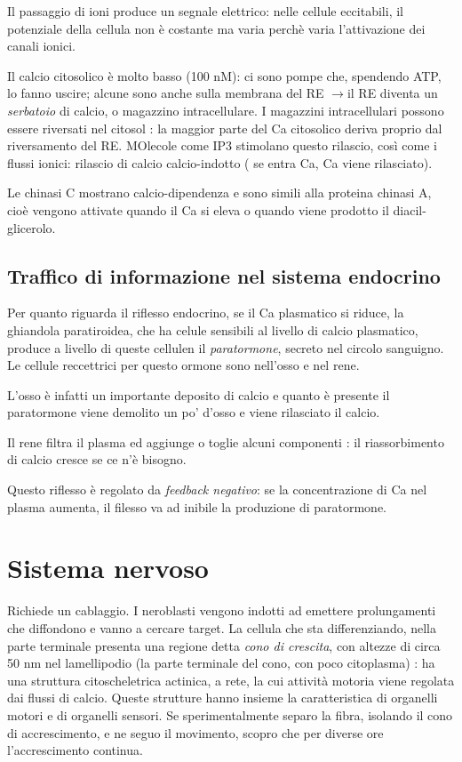 \documentclass[a4paper,12pt]{article}
\newcommand{\lfreccia}{\ensuremath{\longrightarrow}}
\begin{document}
Il passaggio di ioni produce un segnale elettrico: nelle cellule eccitabili, il potenziale della cellula non è costante ma varia perchè varia l'attivazione dei canali ionici.

Il calcio citosolico  è molto basso (100 nM): ci sono pompe che, spendendo ATP, lo fanno uscire; alcune sono anche sulla membrana del RE \lfreccia il RE diventa un \emph{serbatoio} di calcio, o magazzino intracellulare.
I magazzini intracellulari possono essere riversati nel citosol : la maggior parte del Ca citosolico deriva proprio dal riversamento del RE. MOlecole come IP3 stimolano questo rilascio, così come i flussi ionici: rilascio di calcio calcio-indotto ( se entra Ca, Ca viene rilasciato).

Le chinasi C mostrano calcio-dipendenza e sono simili alla proteina chinasi A, cioè vengono attivate quando il Ca si eleva o quando viene prodotto il diacil-glicerolo.

\subsection{Traffico di informazione nel sistema endocrino}
Per quanto riguarda il riflesso endocrino, se il Ca plasmatico si riduce, la ghiandola paratiroidea, che ha celule sensibili al livello di calcio plasmatico, produce a livello di queste cellulen il \emph{paratormone}, secreto nel circolo sanguigno. Le cellule reccettrici per questo ormone sono nell'osso e nel rene. 

L'osso è infatti un importante deposito di calcio e quanto è presente il paratormone viene demolito un po' d'osso e viene rilasciato il calcio. 

Il rene filtra il plasma ed aggiunge o toglie alcuni componenti : il riassorbimento di calcio cresce se ce n'è bisogno.

Questo riflesso è regolato da \emph{feedback negativo}: se la concentrazione di Ca nel plasma aumenta, il filesso va ad inibile la produzione di paratormone.

\section{Sistema nervoso}
Richiede un cablaggio.
I neroblasti vengono indotti ad emettere prolungamenti che diffondono e vanno a cercare target. La cellula che sta differenziando, nella parte terminale presenta una regione detta \emph{cono di crescita}, con altezze di circa 50 nm nel lamellipodio (la parte terminale del cono, con poco citoplasma) : ha una struttura citoscheletrica actinica, a rete, la cui attività motoria viene regolata dai flussi di calcio. Queste strutture hanno insieme la caratteristica di organelli motori e di organelli sensori. Se sperimentalmente separo la fibra, isolando il cono di accrescimento, e ne seguo il movimento, scopro che per diverse ore l'accrescimento continua.
\end{document}
